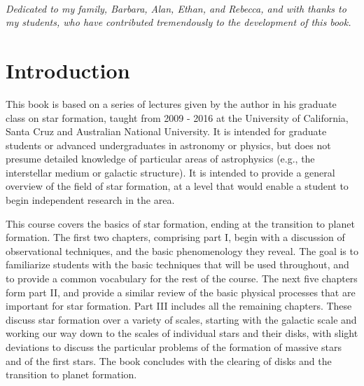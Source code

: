 \documentclass[twoside]{tex/tufte-book} %
\begin{document}


\cleardoublepage
~\vfill
\begin{doublespace}
\noindent\fontsize{18}{22}\selectfont\itshape
\nohyphenation
Dedicated to my family, Barbara, Alan, Ethan, and Rebecca, and with thanks to my students, who have contributed tremendously to the development of this book.
\end{doublespace}
\vfill
\vfill


\cleardoublepage
\chapter*{Introduction} %

This book is based on a series of lectures given by the author in his graduate class on star formation, taught from 2009 - 2016 at the University of California, Santa Cruz and Australian National University. It is intended for graduate students or advanced undergraduates in astronomy or physics, but does not presume detailed knowledge of particular areas of astrophysics (e.g., the interstellar medium or galactic structure). It is intended to provide a general overview of the field of star formation, at a level that would enable a student to begin independent research in the area.

This course covers the basics of star formation, ending at the transition to planet formation. The first two chapters, comprising part I, begin with a discussion of observational techniques, and the basic phenomenology they reveal. The goal is to familiarize students with the basic techniques that will be used throughout, and to provide a common vocabulary for the rest of the course. The next five chapters form part II, and provide a similar review of the basic physical processes that are important for star formation. Part III includes all the remaining chapters. These discuss star formation over a variety of scales, starting with the galactic scale and working our way down to the scales of individual stars and their disks, with slight deviations to discuss the particular problems of the formation of massive stars and of the first stars. The book concludes with the clearing of disks and the transition to planet formation.
\end{document}
